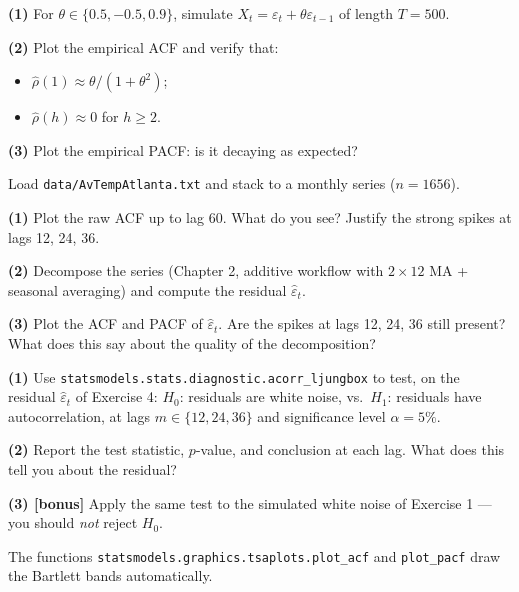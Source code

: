 \documentclass[a4paper,11pt]{article}
\begin{document}
\begin{exercise}[MA(1) simulation]
\textbf{(1)} For $\theta \in \{0.5, -0.5, 0.9\}$, simulate
$X_t = \varepsilon_t + \theta \varepsilon_{t-1}$ of length $T = 500$.

\textbf{(2)} Plot the empirical ACF and verify that:
\begin{itemize}
  \item $\widehat\rho(1) \approx \theta / (1 + \theta^2)$;
  \item $\widehat\rho(h) \approx 0$ for $h \geq 2$.
\end{itemize}

\textbf{(3)} Plot the empirical PACF: is it decaying as expected?
\end{exercise}

\begin{exercise}
Load \texttt{data/AvTempAtlanta.txt} and stack to a monthly series
($n = 1656$).

\textbf{(1)} Plot the raw ACF up to lag 60. What do you see?
Justify the strong spikes at lags 12, 24, 36.

\textbf{(2)} Decompose the series (Chapter 2, additive workflow with
$2 \times 12$ MA + seasonal averaging) and compute the residual
$\widehat\varepsilon_t$.

\textbf{(3)} Plot the ACF and PACF of $\widehat\varepsilon_t$. Are
the spikes at lags 12, 24, 36 still present? What does this say about
the quality of the decomposition?
\end{exercise}

\begin{exercise}
\textbf{(1)} Use \texttt{statsmodels.stats.diagnostic.acorr\_ljungbox}
to test, on the residual $\widehat\varepsilon_t$ of Exercise 4:
$H_0$: residuals are white noise, vs.\ $H_1$: residuals have
autocorrelation, at lags $m \in \{12, 24, 36\}$ and significance level
$\alpha = 5\%$.

\textbf{(2)} Report the test statistic, $p$-value, and conclusion at
each lag. What does this tell you about the residual?

\textbf{(3) [bonus]} Apply the same test to the simulated white noise
of Exercise 1 — you should \emph{not} reject $H_0$.
\end{exercise}

\bigskip
\begin{warning}
The functions \texttt{statsmodels.graphics.tsaplots.plot\_acf} and
\texttt{plot\_pacf} draw the Bartlett bands automatically.
\end{warning}
\end{document}
